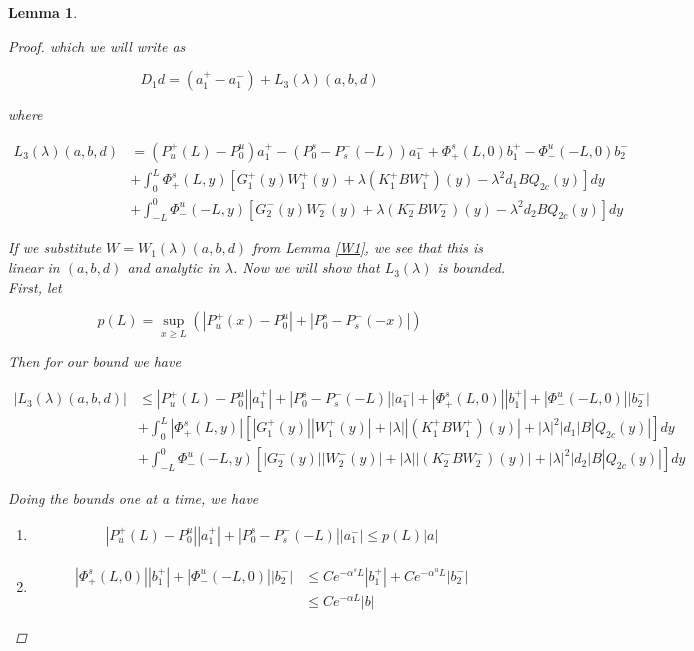 \documentclass[12pt]{article}
\newtheorem{lemma}{Lemma}
\begin{document}
\begin{lemma}
\begin{proof}
which we will write as

\begin{equation}
D_1 d = (a^+_1 - a^-_1) + L_3(\lambda)(a,b,d)
\end{equation}

where 

\begin{align*}
L_3(\lambda)(a,b,d) &= (P_u^+(L) - P_0^u) a^+_1 - (P_0^s - P_s^-(-L)) a^-_1 + \Phi^s_+(L, 0)b_1^+ - \Phi^u_-(-L, 0)b_2^- \\
&+ \int_0^L \Phi^s_+(L, y)[G_1^+(y) W_1^+(y) + \lambda (K_1^+ B W_1^+)(y) - \lambda^2 d_1 B Q_{2c}(y) ] dy \\
&+ \int_{-L}^0 \Phi^u_-(-L, y)[G_2^-(y) W_2^-(y) + \lambda (K_2^- B W_2^-)(y) - \lambda^2 d_2 B Q_{2c}(y) ] dy 
\end{align*}

If we substitute $W = W_1(\lambda)(a,b,d)$ from Lemma \ref{W1}, we see that this is linear in $(a,b,d)$ and analytic in $\lambda$. Now we will show that $L_3(\lambda)$ is bounded. First, let

\[
p(L) = \sup_{x \geq L} (|P_u^+(x) - P_0^u| + |P_0^s - P_s^-(-x)|)
\]

Then for our bound we have

\begin{align*}
|L_3(\lambda)(a,b,d)| &\leq |P_u^+(L) - P_0^u|| a^+_1| + |P_0^s - P_s^-(-L)||a^-_1| + |\Phi^s_+(L, 0)||b_1^+| + |\Phi^u_-(-L, 0)||b_2^-| \\
&+ \int_0^L |\Phi^s_+(L, y)|[|G_1^+(y)||W_1^+(y)| + |\lambda| |(K_1^+ B W_1^+)(y)| + |\lambda|^2 |d_1| B |Q_{2c}(y)| ] dy \\
&+ \int_{-L}^0 \Phi^u_-(-L, y)[|G_2^-(y)||W_2^-(y)| + |\lambda| |(K_2^- B W_2^-)(y)| + |\lambda|^2 |d_2| B |Q_{2c}(y)| ] dy 
\end{align*}

Doing the bounds one at a time, we have

\begin{enumerate}

\item
\begin{align*}
|P_u^+(L) - P_0^u|| a^+_1| + |P_0^s - P_s^-(-L)||a^-_1| \leq p(L)|a|
\end{align*}

\item
\begin{align*}
|\Phi^s_+(L, 0)||b_1^+| + |\Phi^u_-(-L, 0)||b_2^-| &\leq C e^{-\alpha^s L} |b_1^+| + C e^{-\alpha^u L}|b_2^-| \\
&\leq C e^{-\alpha L}|b|
\end{align*}


\end{enumerate}
\end{proof}
\end{lemma}
\end{document}

